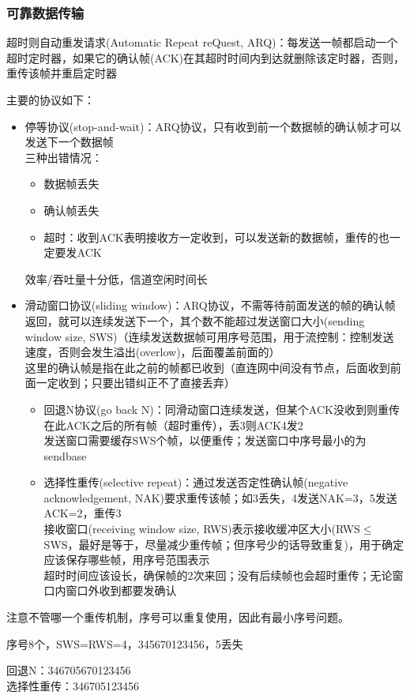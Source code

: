 \subsubsection{可靠数据传输}
超时则自动重发请求(Automatic Repeat reQuest, ARQ)：每发送一帧都启动一个超时定时器，如果它的确认帧(ACK)在其超时时间内到达就删除该定时器，否则，重传该帧并重启定时器

主要的协议如下：
\begin{itemize}
	\item 停等协议(stop-and-wait)：ARQ协议，只有收到前一个数据帧的确认帧才可以发送下一个数据帧\\
	三种出错情况：
	\begin{itemize}
		\item 数据帧丢失
		\item 确认帧丢失
		\item 超时：收到ACK表明接收方一定收到，可以发送新的数据帧，重传的也一定要发ACK
	\end{itemize}
	效率/吞吐量十分低，信道空闲时间长
	\item 滑动窗口协议(sliding window)：ARQ协议，不需等待前面发送的帧的确认帧返回，就可以连续发送下一个，其个数不能超过发送窗口大小(sending window size, SWS)（连续发送数据帧可用序号范围，用于流控制：控制发送速度，否则会发生溢出(overlow)，后面覆盖前面的）\\
	这里的确认帧是指在此之前的帧都已收到（直连网中间没有节点，后面收到前面一定收到；只要出错纠正不了直接丢弃）
	\begin{itemize}
	\item 回退N协议(go back N)：同滑动窗口连续发送，但某个ACK没收到则重传在此ACK之后的所有帧（超时重传），丢3则ACK4发2\\
	发送窗口需要缓存SWS个帧，以便重传；发送窗口中序号最小的为sendbase
	\item 选择性重传(selective repeat)：通过发送否定性确认帧(negative acknowledgement, NAK)要求重传该帧；如3丢失，4发送NAK=3，5发送ACK=2，重传3\\
	接收窗口(receiving window size, RWS)表示接收缓冲区大小(RWS$\leq$SWS，最好是等于，尽量减少重传帧；但序号少的话导致重复)，用于确定应该保存哪些帧，用序号范围表示\\
	超时时间应该设长，确保帧的2次来回；没有后续帧也会超时重传；无论窗口内窗口外收到都要发确认\\
	\end{itemize}
\end{itemize}
注意不管哪一个重传机制，序号可以重复使用，因此有最小序号问题。
\begin{example}
	序号8个，SWS=RWS=4，345670123456，5丢失
\end{example}
\begin{analysis}
	回退N：346705670123456\\
	选择性重传：346705123456
\end{analysis}

